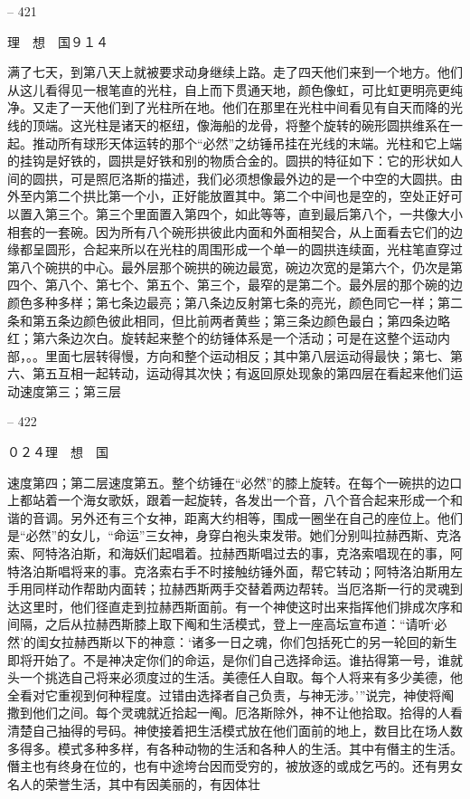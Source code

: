 \documentclass[11pt,oneside]{book}
\begin{document}
\begin{common-format}
    

-- 421

    理　想　国９１４

    满了七天，到第八天上就被要求动身继续上路。走了四天他们来到一个地方。他们从这儿看得见一根笔直的光柱，自上而下贯通天地，颜色像虹，可比虹更明亮更纯净。又走了一天他们到了光柱所在地。他们在那里在光柱中间看见有自天而降的光线的顶端。这光柱是诸天的枢纽，像海船的龙骨，将整个旋转的碗形圆拱维系在一起。推动所有球形天体运转的那个“必然”之纺锤吊挂在光线的末端。光柱和它上端的挂钩是好铁的，圆拱是好铁和别的物质合金的。圆拱的特征如下：它的形状如人间的圆拱，可是照厄洛斯的描述，我们必须想像最外边的是一个中空的大圆拱。由外至内第二个拱比第一个小，正好能放置其中。第二个中间也是空的，空处正好可以置入第三个。第三个里面置入第四个，如此等等，直到最后第八个，一共像大小相套的一套碗。因为所有八个碗形拱彼此内面和外面相契合，从上面看去它们的边缘都呈圆形，合起来所以在光柱的周围形成一个单一的圆拱连续面，光柱笔直穿过第八个碗拱的中心。最外层那个碗拱的碗边最宽，碗边次宽的是第六个，仍次是第四个、第八个、第七个、第五个、第三个，最窄的是第二个。最外层的那个碗的边颜色多种多样；第七条边最亮；第八条边反射第七条的亮光，颜色同它一样；第二条和第五条边颜色彼此相同，但比前两者黄些；第三条边颜色最白；第四条边略红；第六条边次白。旋转起来整个的纺锤体系是一个活动；可是在这整个运动内部，。。里面七层转得慢，方向和整个运动相反；其中第八层运动得最快；第七、第六、第五互相一起转动，运动得其次快；有返回原处现象的第四层在看起来他们运动速度第三；第三层

    

-- 422

    ０２４理　想　国

    速度第四；第二层速度第五。整个纺锤在“必然”的膝上旋转。在每个一碗拱的边口上都站着一个海女歌妖，跟着一起旋转，各发出一个音，八个音合起来形成一个和谐的音调。另外还有三个女神，距离大约相等，围成一圈坐在自己的座位上。他们是“必然”的女儿，“命运”三女神，身穿白袍头束发带。她们分别叫拉赫西斯、克洛索、阿特洛泊斯，和海妖们起唱着。拉赫西斯唱过去的事，克洛索唱现在的事，阿特洛泊斯唱将来的事。克洛索右手不时接触纺锤外面，帮它转动；阿特洛泊斯用左手用同样动作帮助内面转；拉赫西斯两手交替着两边帮转。当厄洛斯一行的灵魂到达这里时，他们径直走到拉赫西斯面前。有一个神使这时出来指挥他们排成次序和间隔，之后从拉赫西斯膝上取下阄和生活模式，登上一座高坛宣布道：“请听‘必然’的闺女拉赫西斯以下的神意：‘诸多一日之魂，你们包括死亡的另一轮回的新生即将开始了。不是神决定你们的命运，是你们自己选择命运。谁拈得第一号，谁就头一个挑选自己将来必须度过的生活。美德任人自取。每个人将来有多少美德，他全看对它重视到何种程度。过错由选择者自己负责，与神无涉。’”说完，神使将阄撒到他们之间。每个灵魂就近拾起一阄。厄洛斯除外，神不让他拾取。拾得的人看清楚自己抽得的号码。神使接着把生活模式放在他们面前的地上，数目比在场人数多得多。模式多种多样，有各种动物的生活和各种人的生活。其中有僭主的生活。僭主也有终身在位的，也有中途垮台因而受穷的，被放逐的或成乞丐的。还有男女名人的荣誉生活，其中有因美丽的，有因体壮


\end{common-format}
\end{document}
